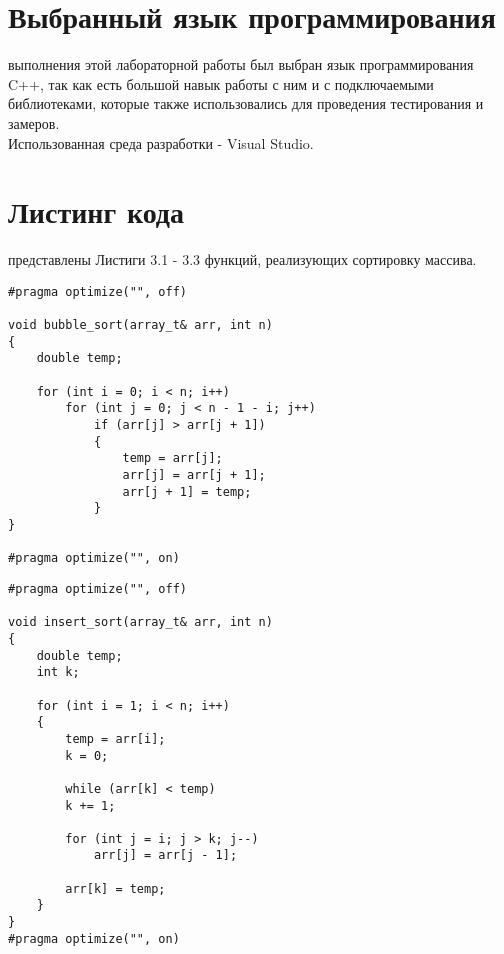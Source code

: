\section{Выбранный язык программирования}
 выполнения этой лабораторной работы был выбран язык программирования C++, так как есть большой навык работы с ним и с подключаемыми библиотеками, которые также использовались для проведения тестирования и замеров.\\

Использованная среда разработки - Visual Studio.

\section{Листинг кода}
 представлены Листиги 3.1 - 3.3 функций, реализующих сортировку массива.
\begin{lstlisting}[label=code, caption = Сортировка пузырьком]
#pragma optimize("", off)

void bubble_sort(array_t& arr, int n)
{
	double temp;
	
	for (int i = 0; i < n; i++)
		for (int j = 0; j < n - 1 - i; j++)
			if (arr[j] > arr[j + 1])
			{
				temp = arr[j];
				arr[j] = arr[j + 1];
				arr[j + 1] = temp;
			}
}

#pragma optimize("", on)
\end{lstlisting}

\begin{lstlisting}[label=code, caption = Сортировка вставками]
#pragma optimize("", off)

void insert_sort(array_t& arr, int n)
{
	double temp;
	int k;
	
	for (int i = 1; i < n; i++)
	{
		temp = arr[i];
		k = 0;
		
		while (arr[k] < temp)
		k += 1;
		
		for (int j = i; j > k; j--)
			arr[j] = arr[j - 1];
		
		arr[k] = temp;
	}
}
#pragma optimize("", on)
\end{lstlisting}

